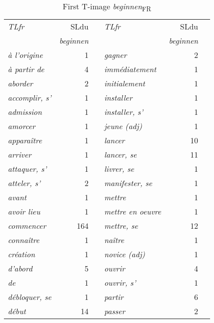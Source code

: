 \begin{table}\small
\caption{First T-image \textit{beginnen}\textsubscript{FR}}
\begin{tabularx}{\textwidth}{>{\itshape}lrX>{\itshape}lrr}\lsptoprule
\normalfont TLfr & SLdu  &     & \normalfont TLfr  & SLdu\\\cmidrule(lr){2-2}\cmidrule(lr){5-5}
& \itshape beginnen   &   & & \itshape beginnen\\\midrule
à l'origine &  1                     & & gagner &  2\\
à partir de &  4                          & & immédiatement &  1\\
aborder &  2                              & & initialement &  1\\
accomplir, s' &  1                        & & installer &  1\\
admission &  1                            & & installer, s' &  1\\
amorcer &  1                              & & jeune (adj) &  1\\
apparaître &  1                           & & lancer &  10\\
arriver &  1                              & & lancer, se &  11\\
attaquer, s' &  1                         & & livrer, se &  1\\
atteler, s' &  2                          & & manifester, se &  1\\
avant &  1                                & & mettre &  1\\
avoir lieu &  1                           & & mettre en oeuvre &  1\\
commencer &  164                          & & mettre, se &  12\\
connaître &  1                            & & naître &  1\\
création &  1                             & & novice (adj) &  1\\
d'abord &  5                              & & ouvrir &  4\\
de &  1                                   & & ouvrir, s' &  1\\
débloquer, se &  1                        & & partir &  6\\
début &  14                               & & passer &  2\\

\end{tabularx}
\end{table}
